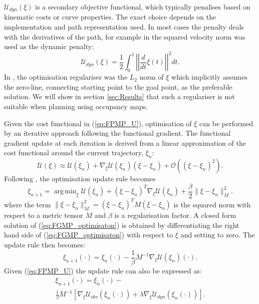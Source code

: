 \documentclass[letterpaper, 10 pt, conference]{ieeeconf}  %
\DeclareMathOperator*{\argmin}{arg\,min}
\begin{document}
$\mathcal{U}_{dyn}(\xi)$ is a secondary objective functional, which typically penalises based on kinematic costs or curve properties. The exact choice depends on the implementation and path representation used. In most cases the penalty deals with the derivatives of the path, for example in \cite{Zucker2013} the squared velocity norm was used as the dynamic penalty:
\begin{equation}\label{eq:velocity_norm}
	\mathcal{U}_{dyn}(\xi) = \frac{1}{2}\int_{0}^{1} \left|\left|\frac{d}{dt}\xi(t) \right|\right|^2 dt.
\end{equation}   
In \cite{Marinho2016}, the optimisation regulariser was the $L_2$ norm of $\xi$ which implicitly assumes the zero-line, connecting starting point to the goal point, as the preferable solution. We will show in section \ref{sec:Results} that such a regulariser is not suitable when planning using occupancy maps. 

Given the cost functional in (\ref{eq:FPMP_U}), optimisation of $\xi$ can be performed by an iterative approach following the functional gradient. The functional gradient update at each iteration is derived from a linear approximation of the cost functional around the current trajectory, $\xi_n$:
\begin{equation}
	\mathcal{U}(\xi) \approx \mathcal{U}(\xi_n)+\nabla_\xi\mathcal{U}(\xi_n)(\xi-\xi_n) + \mathcal{O}((\xi-\xi_n)^2).
\end{equation}
Following \cite{Zucker2013}, the optimisation update rule becomes 
\begin{equation}\label{eq:FGMP_optimisaton}
	\xi_{n+1}= \argmin_\xi \mathcal{U}(\xi_n) + (\xi-\xi_n)^T\nabla_\xi\mathcal{U}(\xi_n) + \frac{\beta}{2}\|\xi-\xi_n\|_M^2.
\end{equation}
where the term $\|\xi-\xi_n\|_M^2 = (\xi-\xi_n)^TM(\xi-\xi_n)$ is the squared norm with respect to a metric tensor $M$ and $\beta$ is a regularisation factor. A closed form solution of (\ref{eq:FGMP_optimisaton}) is obtained by differentiating the right hand side of (\ref{eq:FGMP_optimisaton}) with respect to $\xi$ and setting to zero. The update rule then becomes:
\begin{equation}\label{eq:FGMP_update_rule}
	\xi_{n+1}(\cdot)= \xi_n(\cdot) - \frac{1}{\beta}M^{-1}\nabla_\xi\mathcal{U}(\xi_n)(\cdot).
\end{equation}
Given (\ref{eq:FPMP_U}) the update rule can also be expressed as:
\begin{multline}\label{eq:FGMP_update_rule_full}
\xi_{n+1}(\cdot)= \xi_n(\cdot) - \\ \frac{1}{\beta}M^{-1}\left[\nabla_\xi\mathcal{U}_{obs}(\xi_n(\cdot)) + \lambda\nabla_\xi\mathcal{U}_{dyn}(\xi_n(\cdot))\right].
\end{multline}
\end{document}
